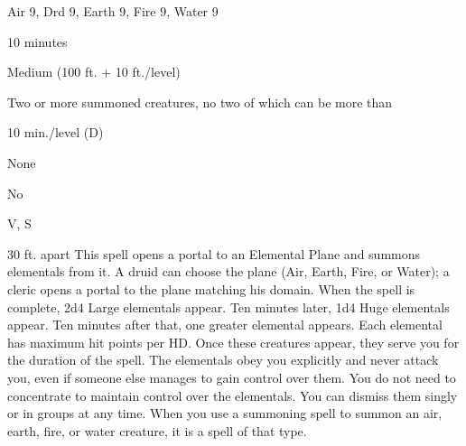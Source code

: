 
\begin{description*}
\item[Level:] Air 9, Drd 9, Earth 9, Fire 9, Water 9
\item[Casting Time:] 10 minutes
\item[Range:] Medium (100 ft. + 10 ft./level)
\item[Effect:] Two or more summoned creatures, no two of which can be more than
\item[Duration:] 10 min./level (D)
\item[Saving Throw:] None
\item[Spell Resistance:] No
\item[Components:] V, S
\end{description*}

30 ft. apart
This spell opens a portal to an Elemental Plane and summons elementals from it.
A druid can choose the plane (Air, Earth, Fire, or Water); a cleric opens a portal
to the plane matching his domain.
When the spell is complete, 2d4 Large elementals appear. Ten minutes later, 1d4
Huge elementals appear. Ten minutes after that, one greater elemental appears.
Each elemental has maximum hit points per HD. Once these creatures appear, they
serve you for the duration of the spell.
The elementals obey you explicitly and never attack you, even if someone else manages
to gain control over them. You do not need to concentrate to maintain control over
the elementals. You can dismiss them singly or in groups at any time.
When you use a summoning spell to summon an air, earth, fire, or water creature,
it is a spell of that type.